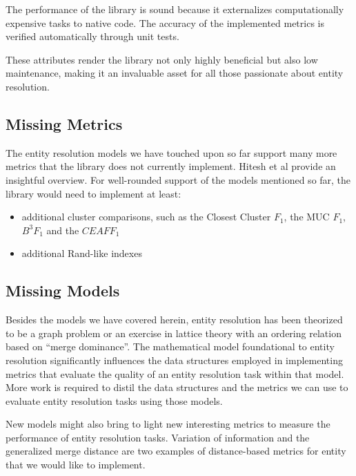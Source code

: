 \documentclass[a4paper,twoside]{article}
\begin{document}
    The performance of the library is sound because it externalizes
    computationally expensive tasks to native code.
    The accuracy of the implemented metrics is verified automatically through
    unit tests.

    These attributes render the library not only highly beneficial but also low
    maintenance, making it an invaluable asset for all those passionate about
    entity resolution.

    \subsection{Missing Metrics}

    The entity resolution models we have touched upon so far support many more
    metrics that the library does not currently implement.
    Hitesh et al provide an insightful overview\cite{hitesh2012}.
    For well-rounded support of the models mentioned so far, the library would
    need to implement at least:
    \begin{itemize}
        \item additional cluster comparisons, such as the Closest Cluster $F_1$, the
        MUC $F_1$, $B^3 F_1$ and the $CEAF F_1$\cite{hitesh2012}
        \item additional Rand-like indexes\cite{warrens2022understanding}
    \end{itemize}

    \subsection{Missing Models}

    Besides the models we have covered herein, entity resolution has been
    theorized to be a graph problem\cite{eager2021} or an exercise in lattice
    theory with an ordering relation based on
    ``merge dominance''\cite{Ben2009Swoosh}.
    The mathematical model foundational to entity resolution significantly
    influences the data structures employed in implementing metrics that
    evaluate the quality of an entity resolution task within that model.
    More work is required to distil the data structures and the metrics we can
    use to evaluate entity resolution tasks using those models.

    New models might also bring to light new interesting metrics to
    measure the performance of entity resolution tasks.
    Variation of information\cite{meila2007vi} and the generalized merge
    distance\cite{Men10} are two examples of distance-based metrics for entity
    that we would like to implement.

    
    {\small
    
    }
\end{document}
